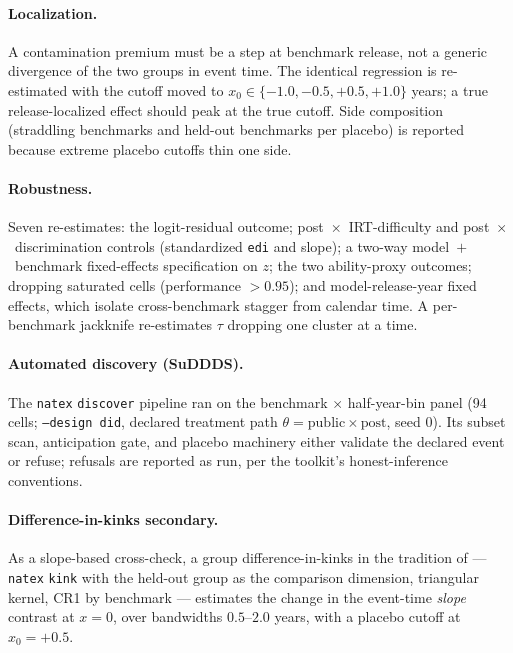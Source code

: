 \documentclass[11pt]{article}
\newcommand{\natex}{\texttt{natex}}
\begin{document}
\paragraph{Localization.} A contamination premium must be a step at
benchmark release, not a generic divergence of the two groups in event
time. The identical regression is re-estimated with the cutoff moved to
$x_0 \in \{-1.0, -0.5, +0.5, +1.0\}$ years; a true release-localized effect
should peak at the true cutoff. Side composition (straddling benchmarks and
held-out benchmarks per placebo) is reported because extreme placebo cutoffs
thin one side.

\paragraph{Robustness.} Seven re-estimates: the logit-residual outcome;
post~$\times$~IRT-difficulty and post~$\times$~discrimination controls
(standardized \texttt{edi} and slope); a two-way model~$+$~benchmark
fixed-effects specification on $z$; the two ability-proxy outcomes;
dropping saturated cells (performance $>0.95$); and model-release-year fixed
effects, which isolate cross-benchmark stagger from calendar time. A
per-benchmark jackknife re-estimates $\tau$ dropping one cluster at a time.

\paragraph{Automated discovery (SuDDDS).} The \natex{} \texttt{discover}
pipeline \cite{natex} ran on the benchmark $\times$ half-year-bin panel
(94 cells; \texttt{--design did}, declared treatment path
$\theta = \mathrm{public} \times \mathrm{post}$, seed 0). Its subset scan,
anticipation gate, and
placebo machinery either validate the declared event or refuse; refusals are
reported as run, per the toolkit's honest-inference conventions.

\paragraph{Difference-in-kinks secondary.} As a slope-based cross-check, a
group difference-in-kinks in the tradition of \cite{bockerman2025} ---
\natex{} \texttt{kink} with the held-out group as the comparison dimension,
triangular kernel, CR1 by benchmark --- estimates the change in the
event-time \emph{slope} contrast at $x=0$, over bandwidths $0.5$--$2.0$
years, with a placebo cutoff at $x_0=+0.5$.
\end{document}
